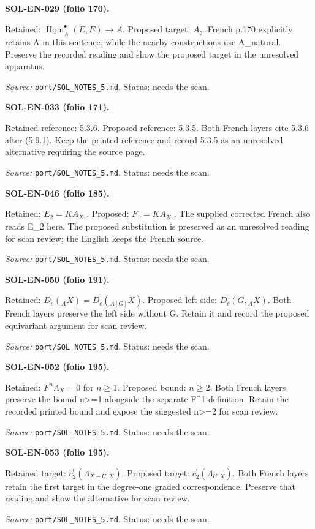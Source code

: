 \medskip\noindent\textbf{SOL-EN-029 (folio 170).}\par
Retained: $\underline{\operatorname{Hom}}_A^\bullet(E,E)\to A$. Proposed target: $A_\natural$.
French p.170 explicitly retains A in this sentence, while the nearby constructions use A\_natural. Preserve the recorded reading and show the proposed target in the unresolved apparatus.
\par\noindent\textit{Source: }\texttt{port/SOL\_NOTES\_5.md}. Status: needs the scan.

\medskip\noindent\textbf{SOL-EN-033 (folio 171).}\par
Retained reference: 5.3.6. Proposed reference: 5.3.5.
Both French layers cite 5.3.6 after (5.9.1). Keep the printed reference and record 5.3.5 as an unresolved alternative requiring the source page.
\par\noindent\textit{Source: }\texttt{port/SOL\_NOTES\_5.md}. Status: needs the scan.

\medskip\noindent\textbf{SOL-EN-046 (folio 185).}\par
Retained: $E_2=KA_{X_1}$. Proposed: $F_1=KA_{X_1}$.
The supplied corrected French also reads E\_2 here. The proposed substitution is preserved as an unresolved reading for scan review; the English keeps the French source.
\par\noindent\textit{Source: }\texttt{port/SOL\_NOTES\_5.md}. Status: needs the scan.

\medskip\noindent\textbf{SOL-EN-050 (folio 191).}\par
Retained: $D_c({}_AX)=D_c({}_{A[G]}X)$. Proposed left side: $D_c(G,{}_AX)$.
Both French layers preserve the left side without G. Retain it and record the proposed equivariant argument for scan review.
\par\noindent\textit{Source: }\texttt{port/SOL\_NOTES\_5.md}. Status: needs the scan.

\medskip\noindent\textbf{SOL-EN-052 (folio 195).}\par
Retained: $F^n\Lambda_X=0$ for $n\geq1$. Proposed bound: $n\geq2$.
Both French layers preserve the bound n>=1 alongside the separate F\textasciicircum{}1 definition. Retain the recorded printed bound and expose the suggested n>=2 for scan review.
\par\noindent\textit{Source: }\texttt{port/SOL\_NOTES\_5.md}. Status: needs the scan.

\medskip\noindent\textbf{SOL-EN-053 (folio 195).}\par
Retained target: $c_2^!(\Lambda_{X-U,X})$. Proposed target: $c_2^!(\Lambda_{U,X})$.
Both French layers retain the first target in the degree-one graded correspondence. Preserve that reading and show the alternative for scan review.
\par\noindent\textit{Source: }\texttt{port/SOL\_NOTES\_5.md}. Status: needs the scan.

